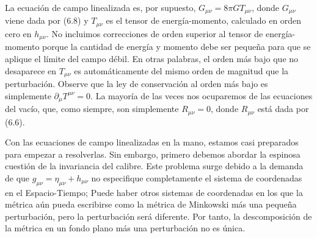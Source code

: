 \documentclass[11pt,b5paper,openany,twoside]{book}
\newcommand{\mn}{{\mu\nu}}
\newcommand{\p}[1]{{\partial_{#1}}}
\begin{document}
La ecuación de campo linealizada es, por supuesto, $G_\mn=8\pi GT_\mn$, donde $G_\mn$ viene dada por (6.8) y $T_\mn$ es el tensor de energía-momento, calculado en orden cero en $h_\mn$.
No incluimos correcciones de orden superior al tensor de energía-momento porque la cantidad de energía y momento debe ser pequeña para que se aplique el límite del campo débil.
En otras palabras, el orden más bajo que no desaparece en $T_\mn$ es automáticamente del mismo orden de magnitud que la perturbación.
Observe que la ley de conservación al orden más bajo es simplemente $\p\mu T^\mn=0$.
La mayoría de las veces nos ocuparemos de las ecuaciones del vacío, que, como siempre, son simplemente $R_\mn=0$, donde $R_\mn$ está dada por (6.6).

Con las ecuaciones de campo linealizadas en la mano, estamos casi preparados para empezar a resolverlas.
Sin embargo, primero debemos abordar la espinosa cuestión de la invariancia del calibre.
Este problema surge debido a la demanda de que $g_\mn=\eta_\mn+h_\mn$ no especifique completamente el sistema de coordenadas en el Espacio-Tiempo; Puede haber otros sistemas de coordenadas en los que la métrica aún pueda escribirse como la métrica de Minkowski más una pequeña perturbación, pero la perturbación será diferente.
Por tanto, la descomposición de la métrica en un fondo plano más una perturbación no es única.
\end{document}
